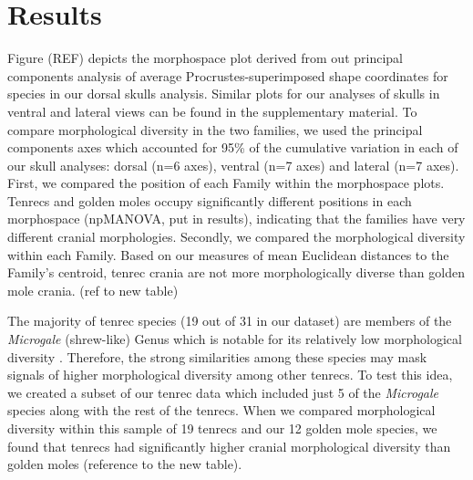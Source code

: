 \documentclass[12pt,a4paper]{article}
\begin{document}

\section{Results}
 
	Figure (REF) depicts the morphospace plot derived from out principal components analysis of average Procrustes-superimposed shape coordinates for species in our dorsal skulls analysis. Similar plots for our analyses of skulls in ventral and lateral views can be found in the supplementary material.
	To compare morphological diversity in the two families, we used the principal components axes which accounted for 95\% of the cumulative variation in each of our skull analyses: dorsal (n=6 axes), ventral (n=7 axes) and lateral (n=7 axes). 
	First, we compared the position of each Family within the morphospace plots. Tenrecs and golden moles occupy significantly different positions in each morphospace (npMANOVA, put in results), indicating that the families have very different cranial morphologies.
	Secondly, we compared the morphological diversity within each Family. Based on our measures of mean Euclidean distances to the Family's centroid, tenrec crania are not more morphologically diverse than golden mole crania. (ref to new table)

	The majority of tenrec species (19 out of 31 in our dataset) are members of the \textit{Microgale} (shrew-like) Genus which is notable for its relatively low morphological diversity \citep{Soarimalala2011, Jenkins2003}. Therefore, the strong similarities among these species may mask signals of higher morphological diversity among other tenrecs. 
	To test this idea, we created a subset of our tenrec data which included
	just 5 of the \textit{Microgale} species along with the rest of the tenrecs. When we compared morphological diversity within this sample of 19 tenrecs and our 12 golden mole species, we found that tenrecs had significantly higher cranial morphological diversity than golden moles (reference to the new table).
\end{document}
